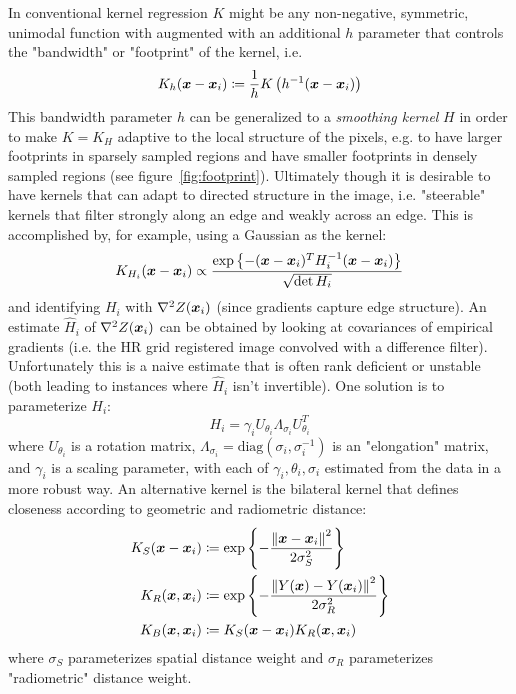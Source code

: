 In conventional kernel regression $K$ might be any non-negative, symmetric, unimodal\cite{wand1994kernel} function with augmented with an additional $h$ parameter that controls the "bandwidth" or "footprint" of the kernel, i.e.
\begin{equation}
    K_h(\bm{x} - \bm{x}_i) \coloneqq \frac{1}{h}K\left( h^{-1}(\bm{x} - \bm{x}_i) \right)
\end{equation}
This bandwidth parameter $h$ can be generalized to a \textit{smoothing kernel} $H$ in order to make $K = K_H$ adaptive to the local structure of the pixels, e.g. to have larger footprints in sparsely sampled regions and have smaller footprints in densely sampled regions (see figure~\ref{fig:footprint}).
%
Ultimately though it is desirable to have kernels that can adapt to directed structure in the image, i.e. "steerable" kernels that filter strongly along an edge and weakly across an edge.
%
This is accomplished by, for example, using a Gaussian as the kernel:
\begin{equation}
    K_{H_i}(\bm{x} - \bm{x}_i) \propto \frac{\exp\left\{ -(\bm{x} - \bm{x}_i)^T H^{-1}_i (\bm{x} - \bm{x}_i) \right\}}{\sqrt{\det{H_i}}}
\end{equation}
and identifying $H_i$ with $\nabla^2 Z(\bm{x}_i)$ (since gradients capture edge structure).
%
An estimate $\hat{H}_i$ of $\nabla^2 Z(\bm{x}_i)$ can be obtained by looking at covariances of empirical gradients (i.e. the HR grid registered image convolved with a difference filter).
%
Unfortunately this is a naive estimate that is often rank deficient or unstable (both leading to instances where $\hat{H}_i$ isn't invertible).
%
One solution is to parameterize $H_i$:
\[
    H_i = \gamma_i U_{\theta_i} \Lambda_{\sigma_i} U_{\theta_i}^T
\]
where $U_{\theta_i}$ is a rotation matrix, $\Lambda_{\sigma_i} = \text{diag}\left( \sigma_i, \sigma_i^{-1} \right)$ is an "elongation" matrix, and $\gamma_i$ is a scaling parameter, with each of $\gamma_i, \theta_i, \sigma_i$ estimated from the data in a more robust way.
%
An alternative kernel is the bilateral kernel\cite{Tomasi:1998:BFG:938978.939190} that defines closeness according to geometric and radiometric distance:
\begin{equation}
    \begin{split}
        K_S(\delx) &\coloneqq \exp \left\{ -\frac{\left\| \delx \right\|^2}{2 \sigma_S^2}  \right\} \\
        K_R(\bx, \bxi) &\coloneqq \exp \left\{ -  \frac{\left\| Y(\bx) - Y(\bxi) \right\|^2}{2 \sigma_R^2} \right\} \\
        K_B(\bx, \bxi) &\coloneqq K_S(\delx)K_R(\bx, \bxi)
    \end{split}
    \label{eqn:bilateralkernel}
\end{equation}
where $\sigma_S$ parameterizes spatial distance weight and $\sigma_R$ parameterizes "radiometric" distance weight.

